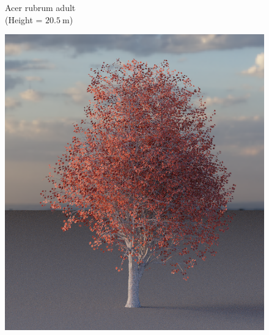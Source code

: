 \begin{figure}[t]
\begin{center}
        \begin{minipage}[c]{0.24\textwidth}
            \begin{flushleft}
                Acer rubrum adult \\
                (Height = $\SI{20.5}{\m}$)
            \end{flushleft}
        \end{minipage}
        \begin{minipage}[c]{0.24\textwidth}
            \includegraphics[valign=c, width=\linewidth]{img/EA01a_mesh.png}
        \end{minipage}
        \begin{minipage}[c]{0.24\textwidth}

\end{minipage}
\end{center}
\end{figure}
